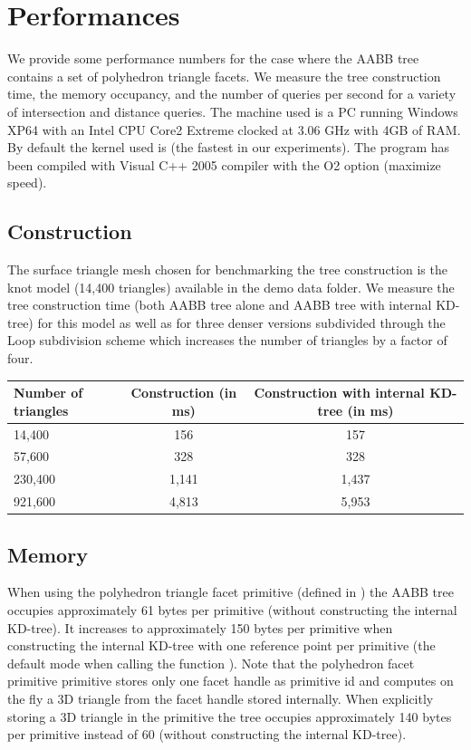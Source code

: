 \section{Performances}
\label{AABB_tree_section_performances}

We provide some performance numbers for the case where the AABB tree contains a set of polyhedron triangle facets. We measure the tree construction time, the memory occupancy, and the number of queries per second for a variety of intersection and distance queries. The machine used is a PC running Windows XP64 with an Intel CPU Core2 Extreme clocked at 3.06 GHz with 4GB of RAM. By default the kernel used is  (the fastest in our experiments). The program has been compiled with Visual C++ 2005 compiler with the O2 option (maximize speed).

\subsection{Construction}

The surface triangle mesh chosen for benchmarking the tree construction is the knot model (14,400 triangles) available in the demo data folder. We measure the tree construction time (both AABB tree alone and AABB tree with internal KD-tree)  for this model as well as for three denser versions subdivided through the Loop subdivision scheme which increases the number of triangles by a factor of four.

\begin{tabular}{|l|c|c|}
  \hline
  Number of triangles & Construction (in ms) & Construction with internal KD-tree (in ms)\\
  \hline
   14,400 &   156 &   157 \\
   57,600 &   328 &   328 \\
  230,400 & 1,141 & 1,437 \\
  921,600 & 4,813 & 5,953 \\
  \hline
\end{tabular}



\subsection{Memory}

When using the polyhedron triangle facet primitive (defined in ) the AABB tree occupies approximately 61 bytes per primitive (without constructing the internal KD-tree). It increases to approximately 150 bytes per primitive when constructing the internal KD-tree with one reference point per primitive (the default mode when calling the function ). Note that the polyhedron facet primitive primitive stores only one facet handle as primitive id and computes on the fly a 3D triangle from the facet handle stored internally. When explicitly storing a 3D triangle in the primitive the tree occupies approximately 140 bytes per primitive instead of 60 (without constructing the internal KD-tree).\\

